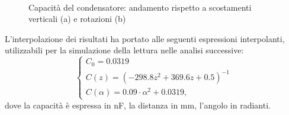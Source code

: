 \begin{figure}[htb]
\\
\caption{Capacità del condensatore: andamento rispetto a scostamenti verticali (a) e rotazioni (b)}
\label{fig:M4condsol}
\end{figure}

L'interpolazione dei risultati ha portato alle seguenti espressioni interpolanti, utilizzabili per la simulazione della lettura nelle analisi successive:
\begin{equation}
\label{eq:6m4cap2d4}
\left\{
\begin{array}{l}
C_0 = 0.0319 \\
C(z) = \left(-298.8 z^2+369.6 z+0.5\right)^{-1}\\
C(\alpha) = 0.09\cdot\alpha^2+0.0319,
\end{array}
\right.
\end{equation}
dove la capacità è espressa in nF, la distanza in mm, l'angolo in radianti. 